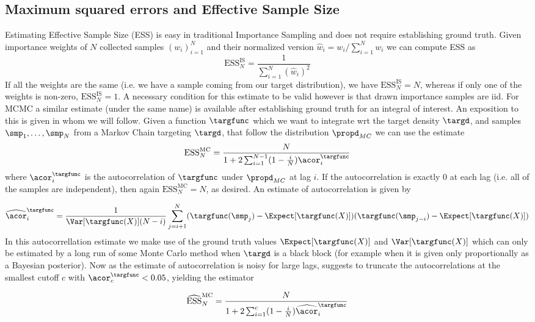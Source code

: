 \subsection{Maximum squared errors and Effective Sample Size}
Estimating  Effective Sample Size (ESS) is easy in traditional Importance Sampling and does not require establishing ground truth. Given importance weights of $N$ collected samples $(w_i)_{i=1}^N$ and their normalized version $\widehat{w}_i = w_i/\sum_{i=1}^N w_i$ we can compute ESS as 
$$\textrm{ESS}^\textrm{IS}_N = \frac{1}{\sum_{i=1}^N(\widehat{w}_i)^2} $$
If all the weights are the same (i.e. we have a sample coming from our target distribution), we have $\textrm{ESS}^\textrm{IS}_N = N$, whereas if only one of the weights is non-zero,  $\textrm{ESS}^\textrm{IS}_N = 1$. A necessary condition for this estimate to be valid however is that drawn importance samples are iid. For MCMC a similar estimate (under the same name) is available after establishing ground truth for an integral of interest. An exposition to this is given in \cite{Hoffman2014} whom we will follow. 
Given a function $\targfunc$ which we want to integrate wrt the target density $\targd$, and samples $\smp_1,\dots, \smp_N$ from a Markov Chain targeting $\targd$, that follow the distribution $\propd_{MC}$ we can use the estimate
$$\textrm{ESS}^\textrm{MC}_N = \frac{N}{1+2\sum_{i=1}^{N-1} (1-\frac{i}{N}) \acor_i^\targfunc} $$
where $\acor_i^\targfunc$ is the autocorrelation of $\targfunc$ under $\propd_{MC}$ at lag $i$.  If the autocorrelation is exactly  $0$ at each lag (i.e. all of the samples are independent), then again $\textrm{ESS}^\textrm{MC}_N=N$, as desired.  An estimate of autocorrelation is given by

$$\widehat{\acor}_i^\targfunc = \frac{1}{\Var[\targfunc(X)](N-i)} \sum_{j=i+1}^N (\targfunc(\smp_{j}) - \Expect[\targfunc(X)]) (\targfunc(\smp_{j-i}) - \Expect[\targfunc(X)])$$
In this autocorrellation estimate we make use of the ground truth values $\Expect[\targfunc(X)]$ and $\Var[\targfunc(X)]$ which can only be estimated by a long run of some Monte Carlo method when $\targd$ is a black block (for example when it is given only proportionally as a Bayesian posterior). Now as the estimate of autocorrelation is noisy for large lags, \cite{Hoffman2014} suggests to truncate the autocorrelations at the smallest cutoff $c$ with $\acor_c^\targfunc < 0.05$, yielding the estimator

$$\widehat{\textrm{ESS}}^\textrm{MC}_N = \frac{N}{1+2\sum_{i=1}^{c} (1-\frac{i}{N}) \widehat{\acor}_i^\targfunc} $$

